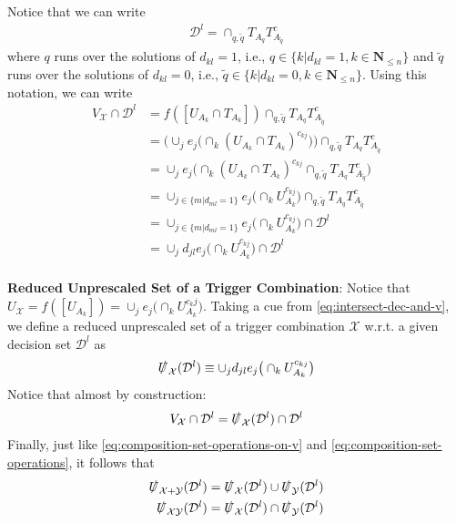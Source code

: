 Notice that we can write 
        \begin{align}
            \mathcal{D}^l=\cap_{q,\tilde{q}}T_{A_q}T^c_{A_{\tilde{q}}}
        \end{align}
where $q$ runs over the solutions of $d_{kl}=1$, i.e., $q\in \{k \vert d_{kl}=1, k\in \mathbf{N}_{\leq n}\}$ and $\tilde{q}$ runs over the solutions of $d_{kl}=0$, i.e., $\tilde{q}\in \{k \vert d_{kl}=0, k\in \mathbf{N}_{\leq n}\}$.
Using this notation, we can write
        \begin{subequations}
        \label{eq:intersect-dec-and-v}
        \begin{align}             
        V_\mathcal{X}\cap \mathcal{D}^l&=f([U_{A_k}\cap T_{A_k}])\cap_{q,\tilde{q}}T_{A_q}T^c_{A_{\tilde{q}}}\\
        &=\Big(\cup_{j}e_j\big(\cap_k (U_{A_k}\cap T_{A_k})^{c_{kj}}\big)\Big)\cap_{q,\tilde{q}}T_{A_q}T^c_{A_{\tilde{q}}}\\
        &=\cup_{j}e_j\Big(\cap_k (U_{A_k}\cap T_{A_k})^{c_{kj}}\cap_{q,\tilde{q}}T_{A_q}T^c_{A_{\tilde{q}}}\Big)\\
        &= \cup_{j\in\{m\vert d_{ml}=1\}} e_j \big(\cap_k U_{A_k}^{c_{kj}}\big) \cap_{q,\tilde{q}}T_{A_q}T^c_{A_{\tilde q}}\\
        &= \cup_{j\in\{m\vert d_{ml}=1\}} e_j\big(\cap_k U_{A_k}^{c_{kj}}\big) \cap \mathcal{D}^l\\
        &= \cup_{j}d_{jl}e_j\big(\cap_k U_{A_k}^{c_{kj}}\big) \cap \mathcal{D}^l
        \end{align}
        \end{subequations} 
\\
\textbf{Reduced Unprescaled Set of a Trigger Combination}: Notice that $U_\mathcal{X}=f([U_{A_k}])=\cup_j e_j\big(\cap_k U_{A_k}^{c_kj}\big)$. Taking a cue from \eqref{eq:intersect-dec-and-v}, we define a reduced unprescaled set of a trigger combination $\mathcal{X}$ w.r.t. a given decision set $\mathcal{D}^l$ as 
    \begin{align}
        \slashed{U}_\mathcal{X}(\mathcal{D}^l)\equiv \cup_{j}d_{jl}e_j\big(\cap_k U_{A_k}^{c_{kj}}\big)
    \end{align}
Notice that almost by construction:
    \begin{align}
        V_{\mathcal{X}}\cap \mathcal{D}^l = \slashed{U}_{\mathcal{X}}(\mathcal{D}^l)\cap \mathcal{D}^l
    \end{align}
Finally, just like \eqref{eq:composition-set-operations-on-v} and \eqref{eq:composition-set-operations}, it follows that 
        \begin{subequations}
        \label{eq:composition-set-operations-on-slashed-u}
        \begin{align}
            \slashed{U}_\mathcal{X+Y}(\mathcal{D}^l)&=\slashed{U}_\mathcal{X}(\mathcal{D}^l)\cup \slashed{U}_\mathcal{Y}(\mathcal{D}^l)\\
            \slashed{U}_\mathcal{XY}(\mathcal{D}^l)&=\slashed{U}_\mathcal{X}(\mathcal{D}^l)\cap \slashed{U}_\mathcal{Y}(\mathcal{D}^l)
        \end{align}
        \end{subequations}
